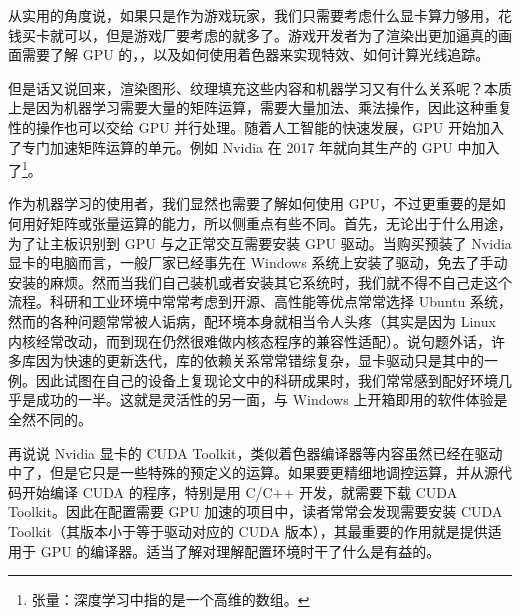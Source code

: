 从实用的角度说，如果只是作为游戏玩家，我们只需要考虑什么显卡算力够用，花钱买卡就可以，但是游戏厂要考虑的就多了。游戏开发者为了渲染出更加逼真的画面需要了解 GPU 的，，以及如何使用着色器来实现特效、如何计算光线追踪。

但是话又说回来，渲染图形、纹理填充这些内容和机器学习又有什么关系呢？本质上是因为机器学习需要大量的矩阵运算，需要大量加法、乘法操作，因此这种重复性的操作也可以交给 GPU 并行处理。随着人工智能的快速发展，GPU 开始加入了专门加速矩阵运算的单元。例如 Nvidia 在 2017 年就向其生产的 GPU 中加入了\footnote{张量：深度学习中指的是一个高维的数组。}。

作为机器学习的使用者，我们显然也需要了解如何使用 GPU，不过更重要的是如何用好矩阵或张量运算的能力，所以侧重点有些不同。首先，无论出于什么用途，为了让主板识别到 GPU 与之正常交互需要安装 GPU 驱动。当购买预装了 Nvidia 显卡的电脑而言，一般厂家已经事先在 Windows 系统上安装了驱动，免去了手动安装的麻烦。然而当我们自己装机或者安装其它系统时，我们就不得不自己走这个流程。科研和工业环境中常常考虑到开源、高性能等优点常常选择 Ubuntu 系统，然而的各种问题常常被人诟病，配环境本身就相当令人头疼（其实是因为 Linux 内核经常改动，而到现在仍然很难做内核态程序的兼容性适配）。说句题外话，许多库因为快速的更新迭代，库的依赖关系常常错综复杂，显卡驱动只是其中的一例。因此试图在自己的设备上复现论文中的科研成果时，我们常常感到配好环境几乎是成功的一半。这就是灵活性的另一面，与 Windows 上开箱即用的软件体验是全然不同的。

再说说 Nvidia 显卡的 CUDA Toolkit，类似着色器编译器等内容虽然已经在驱动中了，但是它只是一些特殊的预定义的运算。如果要更精细地调控运算，并从源代码开始编译 CUDA 的程序，特别是用 C/C++ 开发，就需要下载 CUDA Toolkit。因此在配置需要 GPU 加速的项目中，读者常常会发现需要安装 CUDA Toolkit（其版本小于等于驱动对应的 CUDA 版本），其最重要的作用就是提供适用于 GPU 的编译器。适当了解对理解配置环境时干了什么是有益的。

